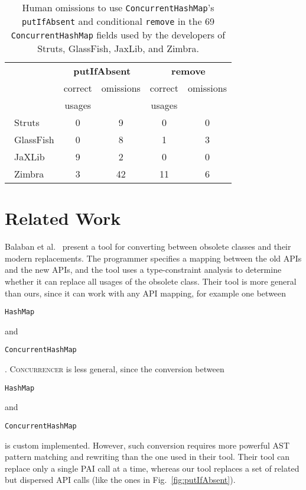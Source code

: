 \documentclass[10pt,preprint]{sigplanconf}
\newcommand\tool{{\smaller\textsc{Concurrencer}}\xspace}
\newcommand{\code}[1]{\begin{small}\texttt{#1}\end{small}}
\begin{document}
\begin{table}
\renewcommand{\arraystretch}{1.3}
\centering
\begin{footnotesize}
\begin{tabular}{l |cc|cc}

             & \multicolumn{2}{|c|}{\textbf{putIfAbsent}}  &\multicolumn{2}{|c}{\textbf{remove}} \\
             & correct& omissions & correct  & omissions  \\
             & usages &           & usages   &            \\ \hline
\ Struts     &  0     &  9        &  0       &  0  \\
\ GlassFish  &  0     &  8        &  1       &  3  \\
\ JaXLib     &  9     &  2        &  0       &  0  \\
\ Zimbra     &  3     &  42       &  11      &  6  \\
\end{tabular}
\caption{Human omissions to use \texttt{ConcurrentHashMap}'s
\texttt{putIfAbsent} and conditional \texttt{remove} in the 69
\texttt{ConcurrentHashMap} fields used by the developers of Struts,
GlassFish, JaxLib, and Zimbra.}
\label{tab:ImproperCHMUsages}
\end{footnotesize}
\vspace{-0.1 in}
\end{table}


\section{Related Work}

Balaban et al.~\cite{Balaban'05} present a tool for converting between obsolete
classes and their modern replacements. The programmer specifies a mapping
between the old APIs and the new APIs, and the tool uses a type-constraint
analysis to determine whether it can replace all usages of the obsolete class.
Their tool is more general than ours, since it can work with any API mapping,
for example one between \code{HashMap} and \code{ConcurrentHashMap}. \tool is
less general, since the conversion between \code{HashMap} and
\code{ConcurrentHashMap} is custom implemented. However, such conversion
requires more powerful AST pattern matching and rewriting than the one used in
their tool. Their tool can replace only a single PAI call at a time, whereas
our tool replaces a set of related but dispersed API calls (like the ones in
Fig.~\ref{fig:putIfAbsent}).
\end{document}
